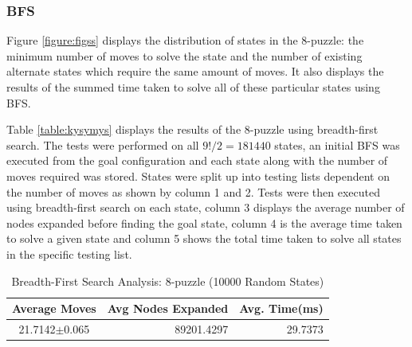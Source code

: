 \documentclass[final]{cmpreport}
\begin{document}
\subsubsection{BFS}

Figure \ref{figure:figss} displays the distribution of states in the 8-puzzle: the minimum number of moves to solve the state and the number of existing alternate states which require the same amount of moves. It also displays the results of the summed time taken to solve all of these particular states using BFS.  

Table \ref{table:kysymys} displays the results of the 8-puzzle using breadth-first search. The tests were performed on all $9!/2=181440$ states, an initial BFS was executed from the goal configuration and each state along with the number of moves required was stored. States were split up into testing lists dependent on the number of moves as shown by column 1 and 2. Tests were then executed using breadth-first search on each state, column 3 displays the average number of nodes expanded before finding the goal state, column 4 is the average time taken to solve a given state and column 5 shows the total time taken to solve all states in the specific testing list.
\begin{table}[ht]
	\caption{Breadth-First Search Analysis: 8-puzzle (10000 Random States)}
	\label{table:bfsRandom}
	\begin{center}
		\begin{tabular}{crr} \hline
			Average Moves & Avg Nodes Expanded & Avg. Time(ms)\\ \hline
			21.7142$\pm$0.065 & 89201.4297 & 29.7373\\ \hline
		\end{tabular}
	\end{center}
\end{table}
\end{document}
